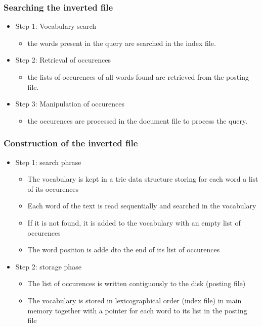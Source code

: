 \subsubsection{Searching the inverted file}

\begin{itemize}
\item Step 1: Vocabulary search
  \begin{itemize}
  \item the words present in the query are searched in the index file.
  \end{itemize}
\item Step 2: Retrieval of occurences
  \begin{itemize}
  \item the lists of occurences of all words found are retrieved from
    the posting file.
  \end{itemize}
\item Step 3: Manipulation of occurences
  \begin{itemize}
  \item the occurences are processed in the document file to process
    the query.
  \end{itemize}
\end{itemize}

\subsubsection{Construction of the inverted file}

\begin{itemize}
\item Step 1: search phrase
  \begin{itemize}
  \item The vocabulary is kept in a trie data structure storing for
    each word a list of its occurences
  \item Each word of the text is read sequentially and searched in the
    vocabulary
  \item If it is not found, it is added to the vocabulary with an
    empty list of occurences
  \item The word position is adde dto the end of its list of
    occurences
  \end{itemize}
\item Step 2: storage phase
  \begin{itemize}
  \item The list of occurences is written contiguously to the disk
    (posting file)
  \item The vocabulary is stored in lexicographical order (index file)
    in main memory together with a pointer for each word to its list
    in the posting file
  \end{itemize}
\end{itemize}

